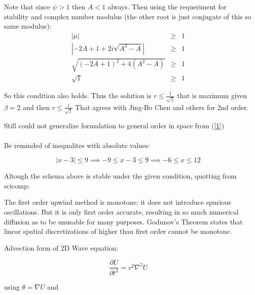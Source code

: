 \documentclass[legalpaper, 12pt]{article}
\begin{document}
Note that since $ \psi > 1 $ then $ A < 1 $ always. Then using the requeriment for stability and complex number modulus (the other root is just conjugate of this so same modulus):
\begin{eqnarray}
| \mu | &\geq& 1 \nonumber \\
	\left|-2 A + 1 + 2i\sqrt{A^2-A}\right| &\geq& 1  \nonumber \\
	\sqrt{(-2 A + 1)^2 + 4(A^2-A) } &\geq& 1  \nonumber \\
	\sqrt{ 1 } &\geq& 1  \nonumber 
\end{eqnarray}

So this condition also holds.
Thus the solution is $ r \leq \frac{1}{ \sqrt{ \beta} } $ that is maximum given $\beta = 2 $ and then $ r \leq \frac{1}{ \sqrt{ 2 } } $ That agrees with Jing-Bo Chen and others for 2nd order.

Still could not generalize formulation to general order in space from (\ref{1})
\\
\\
Be reminded of inequalites with absolute values:

$$ |x-3| \leq 9 \implies -9 \leq x - 3 \leq 9 \implies  -6 \leq x \leq 12 $$

\newpage

Altough the schema above is stable under the given condition, quotting from scicomp:

The first order upwind method is monotone; it does not introduce spurious oscillations. But it is only first order accurate, resulting in so much numerical diffusion as to be unusable for many purposes. Godunov's Theorem states that linear spatial discretizations of higher than first order cannot be monotone.


\newpage


\medspace
\medspace
Advection form of 2D Wave equation:
\medspace

$$ \frac{\partial U}{\partial t ^2} = v^2 \nabla^2 U $$ 

using $\theta = \nabla U $ and 
\end{document}
